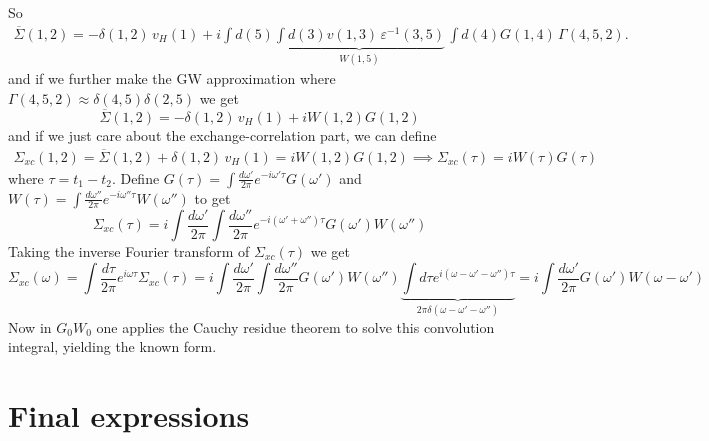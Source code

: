 So
\begin{align}
  \overline{\Sigma}(1,2) = -\delta(1,2)\,v_H(1) +i\int d(5) \underbrace{\int d(3) v(1,3)\, \varepsilon^{-1}(3,5)}_{W(1,5 )}\, \int d(4) G(1,4)\, \Gamma(4,5,2).
  \label{eq:sigma_final_2}
\end{align}
and if we further make the GW approximation where $\Gamma(4,5,2) \approx \delta(4,5)\delta(2,5)$ we get
\begin{equation}
  \overline{\Sigma}(1,2)  = -\delta(1,2)\,v_H(1) + iW(1,2) G(1,2)
  \label{eq:sigma_final_3}
\end{equation}
and if we just care about the exchange-correlation part, we can define
\begin{align}
   {\Sigma}_{xc}(1,2) = \overline{\Sigma}(1,2) + \delta(1,2)\,v_H(1) = i W(1,2) G(1,2) \implies \Sigma_{xc}(\tau) = i W(\tau) G(\tau)
  \label{eq:sigma_xc}
\end{align}
where $\tau = t_1 - t_2$. Define $G(\tau) = \int \frac{d\omega'}{2\pi} e^{-i\omega'\tau} G(\omega')$ and $W(\tau) = \int \frac{d\omega''}{2\pi} e^{-i\omega''\tau} W(\omega'')$ to get
\begin{equation}
  \Sigma_{xc}(\tau) = i \int \frac{d\omega'}{2\pi} \int \frac{d\omega''}{2\pi} e^{-i(\omega'+\omega'')\tau} G(\omega') W(\omega'')
  \label{eq:sigma_xc_freq}
\end{equation}
Taking the inverse Fourier transform of $\Sigma_{xc}(\tau)$ we get
\begin{equation}
  \Sigma_{xc}(\omega) = \int \frac{d\tau}{2\pi} e^{i\omega\tau} \Sigma_{xc}(\tau) = i \int \frac{d\omega'}{2\pi} \int \frac{d\omega''}{2\pi} G(\omega') W(\omega'') \underbrace{\int d\tau  e^{i(\omega -\omega'-\omega'')\tau}}_{2\pi \delta(\omega -\omega'-\omega'')} = i \int \frac{d\omega'}{2\pi} G(\omega') W(\omega-\omega')
  \label{eq:sigma_xc_inv_freq}
\end{equation}
Now in $G_0W_0$ one applies the Cauchy residue theorem to solve this convolution integral, yielding
the known form.





\section{Final expressions}
